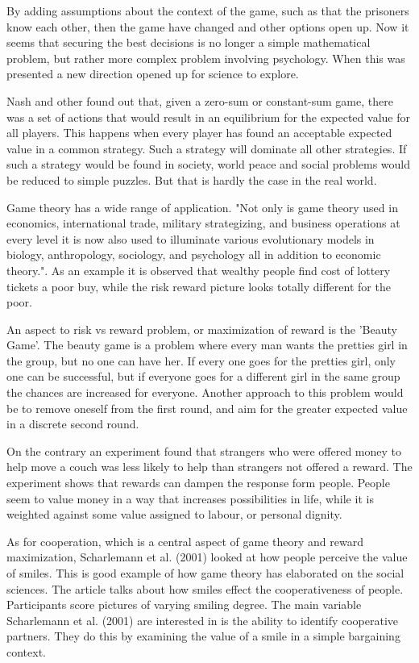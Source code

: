 \documentclass[12pt, a4paper]{article}
\begin{document}
By adding assumptions about the context of the game, such as that the prisoners
know each other, then the game have changed and other options open up. Now it
seems that securing the best decisions is no longer a simple mathematical
problem, but rather more complex problem involving psychology. When this was
presented a new direction opened up for science to explore.\cite{psyinvest}

Nash and other found out that, given a zero-sum or constant-sum game, there was
a set of actions that would result in an equilibrium for the expected value for
all players. This happens when every player has found an acceptable expected
value in a common strategy. Such a strategy will dominate all other strategies.
If such a strategy would be found in society, world peace and social problems
would be reduced to simple puzzles. But that is hardly the case in the real
world. \cite{psyinvest}

Game theory has a wide range of application.
"Not only is game theory used in economics, international trade, military 
strategizing, and business operations at every level it is now also used to
illuminate various evolutionary models in biology, anthropology, sociology, and
psychology all in addition to economic theory."\cite{psyinvest}.
As an example it is observed that wealthy people find cost of lottery tickets a
poor buy, while the risk reward picture looks totally different for the poor. 

An aspect to risk vs reward problem, or maximization of reward is the 'Beauty
Game'. The beauty game is a problem where every man wants the pretties girl in
the group, but no one can have her. If every one goes for the pretties girl,
only one can be successful, but if everyone goes for a different girl in the
same group the chances are increased for everyone. Another approach to this
problem would be to remove oneself from the first round, and aim for the
greater expected value in a discrete second round.\cite{psyinvest} 

On the contrary an experiment found that strangers who were offered money to help
move a couch was less likely to help than strangers not offered a reward. The
experiment shows that rewards can dampen the response form people. People seem
to value money in a way that increases possibilities in life, while it is
weighted against some value assigned to labour, or personal
dignity.\cite{psyinvest}  

As for cooperation, which is a central aspect of game theory and reward
maximization, Scharlemann et al. (2001) looked at how people perceive the value
of smiles. This is good example of how game theory has elaborated on the social
sciences. The article talks about how smiles effect the cooperativeness of
people. Participants score pictures of varying smiling degree. The main
variable Scharlemann et al. (2001) are interested in is the ability to identify
cooperative partners. They do this by examining the value of a smile in a
simple bargaining context.\cite{smile}   
\end{document}
